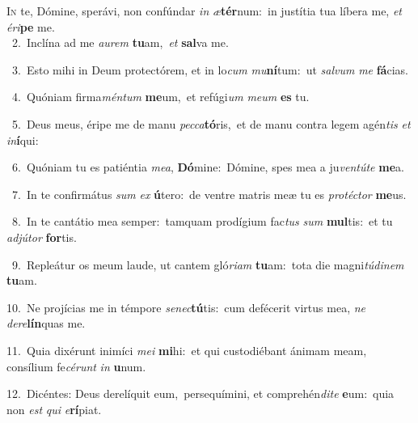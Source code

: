 \lettrine{\initial\textcolor{\initialcolor}{I}}{n} te, Dómine, sperávi, non confúndar \textit{in} \textit{æ}\-\textbf{tér}num:~\star in justítia tua líbera me, \textit{et} \textit{é}\-\textit{ri}\textbf{pe} me.\\
{\numbfont\textcolor{\numbcolor}{~2.}}~Inclína ad me \textit{au}\-\textit{rem} \textbf{tu}\-am,~\star \textit{et} \textbf{sal}\-va me.\par
{\numbfont\textcolor{\numbcolor}{~3.}}~Esto mihi in Deum protectórem, et in lo\textit{cum} \textit{mu}\-\textbf{ní}tum:~\star ut \textit{sal}\-\textit{vum} \textit{me} \textbf{fá}\-cias.\par
{\numbfont\textcolor{\numbcolor}{~4.}}~Quóniam firma\-\textit{mén}\-\textit{tum} \textbf{me}\-um,~\star et refúgi\textit{um} \textit{me}\-\textit{um} \textbf{es} tu.\par
{\numbfont\textcolor{\numbcolor}{~5.}}~Deus meus, éripe me de manu \textit{pec}\-\textit{ca}\textbf{tó}ris,~\star et de manu contra legem agén\textit{tis} \textit{et} \textit{in}\-\textbf{í}qui:\par
{\numbfont\textcolor{\numbcolor}{~6.}}~Quóniam tu es patiéntia \textit{me}\-\textit{a}, \textbf{Dó}\-mine:~\star Dómine, spes mea a ju\-\textit{ven}\-\textit{tú}\textit{te} \textbf{me}\-a.\par
{\numbfont\textcolor{\numbcolor}{~7.}}~In te confirmátus \textit{sum} \textit{ex} \textbf{ú}\-tero:~\star de ventre matris meæ tu es \textit{pro}\-\textit{téc}\textit{tor} \textbf{me}\-us.\par
{\numbfont\textcolor{\numbcolor}{~8.}}~In te cantátio mea semper:~\dagger tamquam prodígium fac\textit{tus} \textit{sum} \textbf{mul}\-tis:~\star et tu \textit{ad}\-\textit{jú}\textit{tor} \textbf{for}\-tis.\par
{\numbfont\textcolor{\numbcolor}{~9.}}~Repleátur os meum laude, ut cantem gló\-\textit{ri}\-\textit{am} \textbf{tu}\-am:~\star tota die magni\-\textit{tú}\-\textit{di}\textit{nem} \textbf{tu}\-am.\par
{\numbfont\textcolor{\numbcolor}{10.}}~Ne projícias me in témpore \textit{se}\-\textit{nec}\textbf{tú}tis:~\star cum defécerit virtus mea, \textit{ne} \textit{de}\-\textit{re}\textbf{lín}quas me.\par
{\numbfont\textcolor{\numbcolor}{11.}}~Quia dixérunt inimíci \textit{me}\-\textit{i} \textbf{mi}\-hi:~\star et qui custodiébant ánimam meam, consílium fe\-\textit{cé}\-\textit{runt} \textit{in} \textbf{u}\-num.\par
{\numbfont\textcolor{\numbcolor}{12.}}~Dicéntes: Deus derelíquit eum,~\dagger persequímini, et comprehén\-\textit{di}\-\textit{te} \textbf{e}\-um:~\star quia non \textit{est} \textit{qui} \textit{e}\-\textbf{rí}piat.\par
